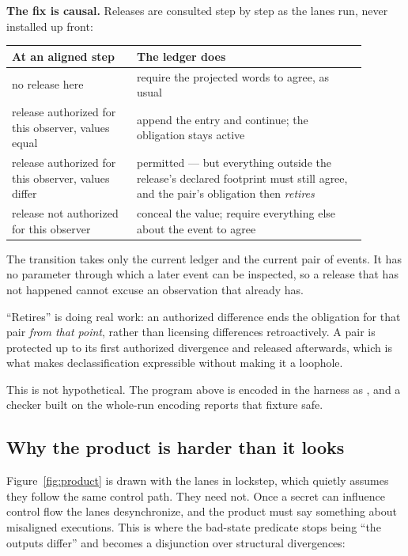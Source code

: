 \textbf{The fix is causal.} Releases are consulted step by step as the lanes run,
never installed up front:

\begin{center}
\begin{tabular}{@{}p{0.31\linewidth} p{0.58\linewidth}@{}}
\toprule
At an aligned step & The ledger does \\
\midrule
no release here
  & require the projected words to agree, as usual \\[3pt]
release authorized for this observer, values equal
  & append the entry and continue; the obligation stays active \\[3pt]
release authorized for this observer, values differ
  & permitted --- but everything outside the release's declared footprint must
    still agree, and the pair's obligation then \emph{retires} \\[3pt]
release not authorized for this observer
  & conceal the value; require everything else about the event to agree \\
\bottomrule
\end{tabular}
\end{center}

The transition takes only the current ledger and the current pair of events. It
has no parameter through which a later event can be inspected, so a release that
has not happened cannot excuse an observation that already has.

\begin{remark}
\label{rem:mtcm3}
``Retires'' is doing real work: an authorized difference ends the obligation for
that pair \emph{from that point}, rather than licensing differences
retroactively. A pair is protected up to its first authorized divergence and
released afterwards, which is what makes declassification expressible without
making it a loophole.

This is not hypothetical. The program above is encoded in the harness as
, and a checker built on the whole-run
encoding reports that fixture safe.
\end{remark}

\subsection{Why the product is harder than it looks}

Figure~\ref{fig:product} is drawn with the lanes in lockstep, which quietly
assumes they follow the same control path. They need not. Once a secret can
influence control flow the lanes desynchronize, and the product must say
something about misaligned executions. This is where the bad-state predicate
stops being ``the outputs differ'' and becomes a disjunction over structural
divergences:

